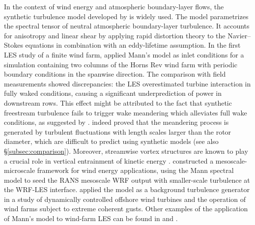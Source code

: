 	In the context of wind energy and atmospheric boundary-layer flows,  the synthetic turbulence model developed by \cite{mann1998wind} is widely used.
	The model parametrizes the spectral tensor of neutral atmospheric boundary-layer turbulence.
	It accounts for anisotropy and linear shear by applying rapid distortion theory to the Navier--Stokes equations in combination with an eddy-lifetime assumption.
	In the first LES study of a finite wind farm, \cite{ivanell2009numerical} applied Mann's model as inlet conditions for a simulation containing
	two columns of the Horns Rev wind farm with periodic boundary conditions in the spanwise direction.
	The comparison with field measurements showed discrepancies: the LES overestimated turbine interaction in fully waked conditions, causing a significant underprediction of power in downstream rows. This effect might be attributed to the fact that synthetic freestream turbulence fails to trigger wake meandering which alleviates full wake conditions, as suggested by \cite{churchfield2012large}.
	\cite{espana2011spatial} indeed proved that the meandering process is generated by turbulent fluctuations with length scales larger than the rotor diameter, which are difficult to predict using synthetic models (see also \S\ref{subsec:comparison}).
	Moreover, streamwise vortex structures are known to play a crucial role in vertical entrainment of kinetic energy \citep{cal2010experimental,calaf2010large}.
	\cite{gopalan2014coupled} constructed a mesoscale-microscale framework for wind energy applications, using the Mann spectral model to seed the RANS mesoscale WRF output with smaller-scale turbulence at the WRF-LES interface.
	\cite{storey2013large,storey2014modelling} applied the model as a background turbulence generator in a study of dynamically controlled offshore wind turbines and the operation of wind farms subject to extreme coherent gusts. Other examples of the application of Mann's model to wind-farm LES can be found in \cite{keck2013synthetic,breton2014study} and \cite{sarlak2015role}.
	
	

